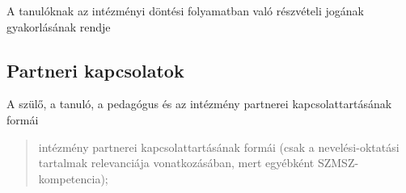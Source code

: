 A tanulóknak az intézményi döntési folyamatban való részvételi jogának
gyakorlásának rendje

\subsection{Partneri kapcsolatok}\label{partneri-kapcsolatok}

A szülő, a tanuló, a pedagógus és az intézmény partnerei
kapcsolattartásának formái

\begin{quote}
intézmény partnerei kapcsolattartásának formái (csak a nevelési-oktatási
tartalmak relevanciája vonatkozásában, mert egyébként
SZMSZ-kompetencia);
\end{quote}
